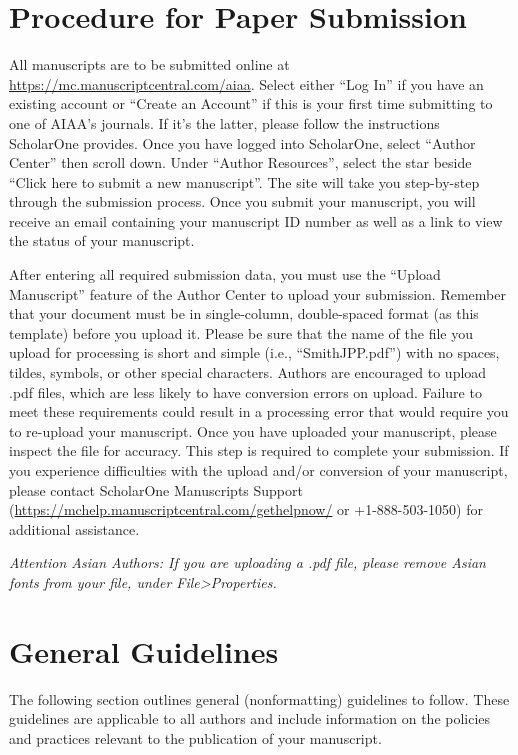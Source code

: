 \documentclass[journal]{new-aiaa}
\begin{document}
\section{Procedure for Paper Submission}

All manuscripts are to be submitted online at \url{https://mc.manuscriptcentral.com/aiaa}. Select either “Log In” if you have an existing account or “Create an Account” if this is your first time submitting to one of AIAA’s journals. If it’s the latter, please follow the instructions ScholarOne provides. Once you have logged into ScholarOne, select “Author Center” then scroll down. Under “Author Resources”, select the star beside “Click here to submit a new manuscript”. The site will take you step-by-step through the submission process. Once you submit your manuscript, you will receive an email containing your manuscript ID number as well as a link to view the status of your manuscript. 

After entering all required submission data, you must use the “Upload Manuscript” feature of the Author Center to upload your submission. Remember that your document must be in single-column, double-spaced format (as this template) before you upload it. Please be sure that the name of the file you upload for processing is short and simple (i.e., “SmithJPP.pdf”) with no spaces, tildes, symbols, or other special characters. Authors are encouraged to upload .pdf files, which are less likely to have conversion errors on upload. Failure to meet these requirements could result in a processing error that would require you to re-upload your manuscript. Once you have uploaded your manuscript, please inspect the file for accuracy. This step is required to complete your submission. If you experience difficulties with the upload and/or conversion of your manuscript, please contact ScholarOne Manuscripts Support (\url{https://mchelp.manuscriptcentral.com/gethelpnow/} or +1-888-503-1050) for additional assistance. 

\emph{Attention Asian Authors: If you are uploading a .pdf file, please remove Asian fonts from your file, under File>Properties.}

\section{General Guidelines}

The following section outlines general (nonformatting) guidelines to follow. These guidelines are applicable to all authors and include information on the policies and practices relevant to the publication of your manuscript.
\end{document}
